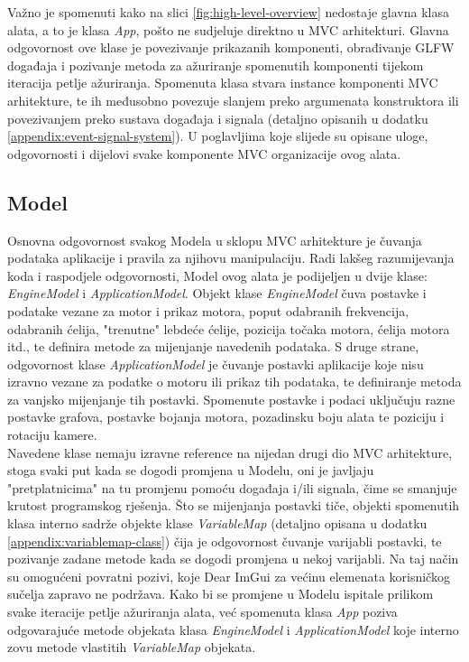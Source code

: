 \documentclass[times, utf8, diplomski]{fer}
\begin{document}
Važno je spomenuti kako na slici \ref{fig:high-level-overview} nedostaje glavna klasa alata, a to je klasa \textit{App}, pošto ne sudjeluje direktno u MVC arhitekturi. Glavna odgovornost ove klase je povezivanje prikazanih komponenti, obrađivanje GLFW događaja i pozivanje metoda za ažuriranje spomenutih komponenti tijekom iteracija petlje ažuriranja. Spomenuta klasa stvara instance komponenti MVC arhitekture, te ih međusobno povezuje slanjem preko argumenata konstruktora ili povezivanjem preko sustava događaja i signala (detaljno opisanih u dodatku \ref{appendix:event-signal-system}). U poglavljima koje slijede su opisane uloge, odgovornosti i dijelovi svake komponente MVC organizacije ovog alata.

\subsection{Model}
Osnovna odgovornost svakog Modela u sklopu MVC arhitekture je čuvanja podataka aplikacije i pravila za njihovu manipulaciju. Radi lakšeg razumijevanja koda i raspodjele odgovornosti, Model ovog alata je podijeljen u dvije klase: \textit{EngineModel} i \textit{ApplicationModel}. Objekt klase \textit{EngineModel} čuva postavke i podatake vezane za motor i prikaz motora, poput odabranih frekvencija, odabranih ćelija, "trenutne" lebdeće ćelije, pozicija točaka motora, ćelija motora itd., te definira metode za mijenjanje navedenih podataka. S druge strane, odgovornost klase \textit{ApplicationModel} je čuvanje postavki aplikacije koje nisu izravno vezane za podatke o motoru ili prikaz tih podataka, te definiranje metoda za vanjsko mijenjanje tih postavki. Spomenute postavke i podaci uključuju razne postavke grafova, postavke bojanja motora, pozadinsku boju alata te poziciju i rotaciju kamere.\\

Navedene klase nemaju izravne reference na nijedan drugi dio MVC arhitekture, stoga svaki put kada se dogodi promjena u Modelu, oni je javljaju "pretplatnicima" na tu promjenu pomoću događaja i/ili signala, čime se smanjuje krutost programskog rješenja. Što se mijenjanja postavki tiče, objekti spomenutih klasa interno sadrže objekte klase \textit{VariableMap} (detaljno opisana u dodatku \ref{appendix:variablemap-class}) čija je odgovornost čuvanje varijabli postavki, te pozivanje zadane metode kada se dogodi promjena u nekoj varijabli. Na taj način su omogućeni povratni pozivi, koje Dear ImGui za većinu elemenata korisničkog sučelja zapravo ne podržava. Kako bi se promjene u Modelu ispitale prilikom svake iteracije petlje ažuriranja alata, već spomenuta klasa \textit{App} poziva odgovarajuće metode objekata klasa \textit{EngineModel} i \textit{ApplicationModel} koje interno zovu metode vlastitih \textit{VariableMap} objekata.
\end{document}
